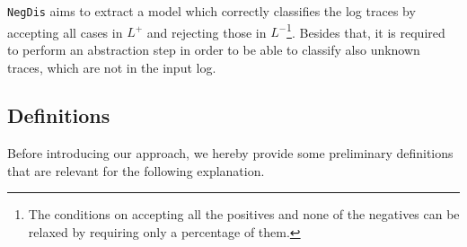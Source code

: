 \documentclass[a4wide,11pt]{article}
\theoremstyle{definition}
\newtheorem{definition}{Definition}[section]
\theoremstyle{plain}
\newcommand{\nd}{\texttt{NegDis}\xspace}
\begin{document}
\nd aims to extract a model which correctly classifies the log traces by accepting all cases in $L^+$ and rejecting those in $L^-$\footnote{The conditions on accepting all the positives and none of the negatives can be relaxed by requiring only a percentage of them.}. Besides that, it is required to perform an abstraction step in order to be able to classify also unknown traces, which are not in the input log. %

\subsection{Definitions}
Before introducing our approach, we hereby provide some preliminary definitions that are relevant for the following explanation.



\end{document}
